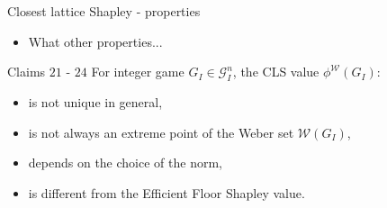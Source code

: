 \documentclass{beamer}
\begin{document}
\begin{frame}{Closest lattice Shapley - properties}
    \pause

    \begin{itemize}
        \item What other properties...
    \end{itemize}

    \pause

    \begin{block}{Claims $21$ - $24$}
        For integer game $G_I \in \mathcal{G}_I^n$, the CLS value $\phi^\mathcal{W}(G_I)$:
        \begin{itemize}
            \item is not unique in general,
            \item is not always an extreme point of the Weber set $\mathcal{W}(G_I)$,
            \item depends on the choice of the norm,
            \item is different from the Efficient Floor Shapley value.
        \end{itemize}
    \end{block}
\end{frame}


\end{document}
